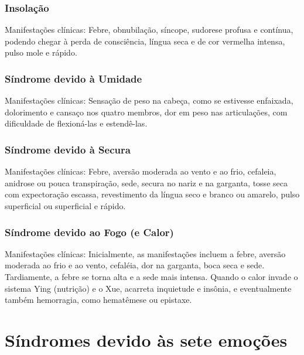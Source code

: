 \documentclass[12pt,oneside,a4paper]{book} %
\begin{document}
\subsection{Insolação}
Manifestações clínicas: Febre, obnubilação, síncope, sudorese profusa e contínua, podendo chegar à perda de consciência, língua seca e de cor vermelha intensa, pulso mole e rápido.

\subsection{Síndrome devido à Umidade} 
Manifestações clínicas: Sensação de peso na cabeça, como se estivesse enfaixada, dolorimento e cansaço nos quatro membros, dor em peso nas articulações, com dificuldade de flexioná-las e estendê-las.

\subsection{Síndrome devido à Secura} 
Manifestações clínicas: Febre, aversão moderada ao vento e ao frio, cefaleia, anidrose ou pouca transpiração, sede, secura no nariz e na garganta, tosse seca com expectoração escassa, revestimento da língua seco e branco ou amarelo, pulso superficial ou superficial e rápido.

\subsection{Síndrome devido ao Fogo (e Calor)} 
Manifestações clínicas: Inicialmente, as manifestações incluem a febre, aversão moderada ao frio e ao vento, cefaléia, dor na garganta, boca seca e sede. Tardiamente, a febre se torna alta e a sede mais intensa. Quando o calor invade o sistema Ying (nutrição) e o Xue, acarreta inquietude e insônia, e eventualmente também hemorragia, como hematêmese ou epistaxe.


\chapter{Síndromes devido às sete emoções} 
\end{document}
